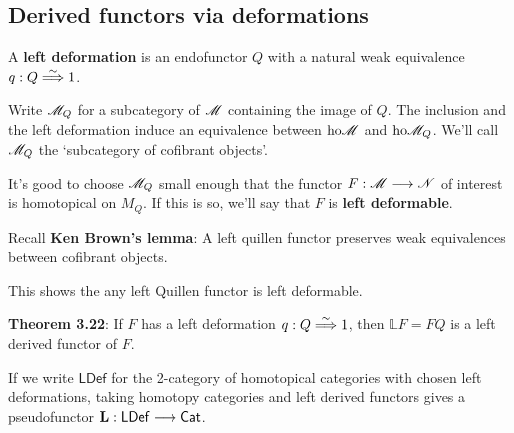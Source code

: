 \documentclass[11pt]{article}
\begin{document}
\begin{3. Derived functors via deformations}
\subsection*{Derived functors via deformations}
\begin{itemise}
\setlength{\parindent}{.25in}
\item A \textbf{left deformation} is an endofunctor $Q$ with a natural weak equivalence $q:Q\overset{\sim}{\Longrightarrow}1$.
\item Write $\mathscr{M}_Q$ for a subcategory of $\mathscr{M}$ containing the image of $Q$. The inclusion and the left deformation induce an equivalence between $\textup{ho}\mathscr{M}$ and $\textup{ho}\mathscr{M}_Q$. We'll call $\mathscr{M}_Q$ the `subcategory of cofibrant objects'.

It's good to choose $\mathscr{M}_Q$ small enough that the functor $F:\mathscr{M}\longrightarrow\mathscr{N}$ of interest is homotopical on $M_Q$. If this is so, we'll say that $F$ is \textbf{left deformable}.
\item Recall \textbf{Ken Brown's lemma}: A left quillen functor preserves weak equivalences between cofibrant objects.

This shows the any left Quillen functor is left deformable.
\item \textbf{Theorem 3.22}: If $F$ has a left deformation $q:Q\overset{\sim}{\Longrightarrow}1$, then $\mathbb{L}F=FQ$ is a left derived functor of $F$.
\item If we write $\mathsf{LDef}$ for the 2-category of homotopical categories with chosen left deformations, taking homotopy categories and left derived functors gives a pseudofunctor $\textbf{L}:\mathsf{LDef}\longrightarrow\operatorname{{\mathsf{Cat}}}$.


\end{itemise}
\end{3. Derived functors via deformations}
\end{document}
